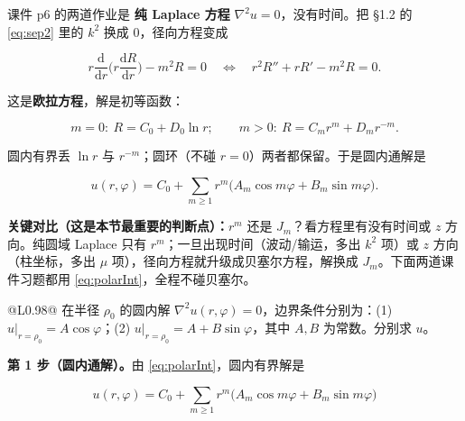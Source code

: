 \documentclass[11pt]{ctexart}
\renewcommand{\thead}[1]{\leavevmode{\bfseries\color{violetdeep}#1}}
\let\origsubhdr\subhdr
\renewcommand{\subhdr}[1]{\par\needspace{3\baselineskip}\origsubhdr{#1}}
\let\orighdr\hdr
\renewcommand{\hdr}[2]{\par\needspace{6\baselineskip}\orighdr{#1}{#2}}
\begin{document}
\label{sec:s4}


课件 p6 的两道作业是 \textbf{纯 Laplace 方程} $\nabla^2u=0$，没有时间。把 \S1.2 的 \eqref{eq:sep2} 里的 $k^2$ 换成 $0$，径向方程变成

\begin{equation}
r\frac{\mathrm d}{\mathrm dr}\Big(r\frac{\mathrm dR}{\mathrm dr}\Big)-m^2R=0
\quad\Longleftrightarrow\quad
r^2R''+rR'-m^2R=0 .
\label{eq:euler}
\end{equation}

这是\textbf{欧拉方程}，解是初等函数：

\[
m=0:\ R=C_0+D_0\ln r;\qquad
m>0:\ R=C_mr^m+D_mr^{-m}.
\]

圆内有界丢 $\ln r$ 与 $r^{-m}$；圆环（不碰 $r=0$）两者都保留。于是圆内通解是

\begin{equation}
u(r,\varphi)=C_0+\sum_{m\ge1}r^m\big(A_m\cos m\varphi+B_m\sin m\varphi\big).
\label{eq:polarInt}
\end{equation}

\textbf{关键对比（这是本节最重要的判断点）：}$r^m$ 还是 $J_m$？看方程里有没有时间或 $z$ 方向。纯圆域 Laplace 只有 $r^m$；一旦出现时间（波动/输运，多出 $k^2$ 项）或 $z$ 方向（柱坐标，多出 $\mu$ 项），径向方程就升级成贝塞尔方程，解换成 $J_m$。下面两道课件习题都用 \eqref{eq:polarInt}，全程不碰贝塞尔。


\begin{center}
\tabtop
\begin{tabular}{@{}L{0.98\linewidth}@{}}
\thead{课件 p6 作业 5}\quad 在半径 $\rho_0$ 的圆内解 $\nabla^2u(r,\varphi)=0$，边界条件分别为：(1) $u\big|_{r=\rho_0}=A\cos\varphi$；(2) $u\big|_{r=\rho_0}=A+B\sin\varphi$，其中 $A,B$ 为常数。分别求 $u$。 \\
\end{tabular}
\tabbot
\end{center}

\textbf{第 1 步（圆内通解）。}由 \eqref{eq:polarInt}，圆内有界解是

\[
u(r,\varphi)=C_0+\sum_{m\ge1}r^m\big(A_m\cos m\varphi+B_m\sin m\varphi\big)
\]
\end{document}
